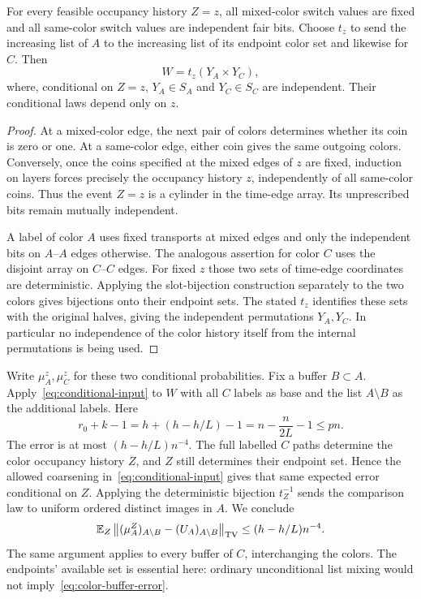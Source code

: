 \begin{lemma}\label{lem:color-product}
For every feasible occupancy history $Z=z$, all mixed-color switch values are fixed and all same-color switch values are independent fair bits. Choose $t_z$ to send the increasing list of $A$ to the increasing list of its endpoint color set and likewise for $C$. Then
\[
 W=t_z(Y_A\times Y_C),
\]
where, conditional on $Z=z$, $Y_A\in S_A$ and $Y_C\in S_C$ are independent. Their conditional laws depend only on $z$.
\end{lemma}
\begin{proof}
At a mixed-color edge, the next pair of colors determines whether its coin is zero or one. At a same-color edge, either coin gives the same outgoing colors. Conversely, once the coins specified at the mixed edges of $z$ are fixed, induction on layers forces precisely the occupancy history $z$, independently of all same-color coins. Thus the event $Z=z$ is a cylinder in the time-edge array. Its unprescribed bits remain mutually independent.

A label of color $A$ uses fixed transports at mixed edges and only the independent bits on $A$--$A$ edges otherwise. The analogous assertion for color $C$ uses the disjoint array on $C$--$C$ edges. For fixed $z$ those two sets of time-edge coordinates are deterministic. Applying the slot-bijection construction separately to the two colors gives bijections onto their endpoint sets. The stated $t_z$ identifies these sets with the original halves, giving the independent permutations $Y_A,Y_C$. In particular no independence of the color history itself from the internal permutations is being used.
\end{proof}

Write $\mu_A^z,\mu_C^z$ for these two conditional probabilities. Fix a buffer $B\subset A$. Apply~\eqref{eq:conditional-input} to $W$ with all $C$ labels as base and the list $A\setminus B$ as the additional labels. Here
\[
 r_0+k-1=h+(h-h/L)-1
        =n-\frac n{2L}-1\le pn.
\]
The error is at most $(h-h/L)n^{-4}$. The full labelled $C$ paths determine the color occupancy history $Z$, and $Z$ still determines their endpoint set. Hence the allowed coarsening in~\eqref{eq:conditional-input} gives that same expected error conditional on $Z$. Applying the deterministic bijection $t_Z^{-1}$ sends the comparison law to uniform ordered distinct images in $A$. We conclude
\begin{equation}\label{eq:color-buffer-error}
 \mathbb E_Z\left\| (\mu_A^Z)_{A\setminus B}
          -(U_A)_{A\setminus B}\right\|_{\mathrm{TV}}
 \le(h-h/L)n^{-4}.
\end{equation}
The same argument applies to every buffer of $C$, interchanging the colors. The endpoints' available set is essential here: ordinary unconditional list mixing would not imply~\eqref{eq:color-buffer-error}.

